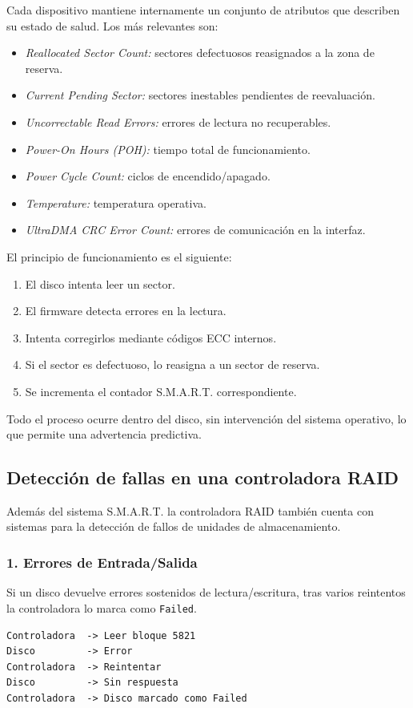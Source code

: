 Cada dispositivo mantiene internamente un conjunto de atributos que describen su estado de salud. Los más relevantes son:
\begin{itemize}
  \item \textit{Reallocated Sector Count:} sectores defectuosos reasignados a la zona de reserva.
  \item \textit{Current Pending Sector:} sectores inestables pendientes de reevaluación.
  \item \textit{Uncorrectable Read Errors:} errores de lectura no recuperables.
  \item \textit{Power-On Hours (POH):} tiempo total de funcionamiento.
  \item \textit{Power Cycle Count:} ciclos de encendido/apagado.
  \item \textit{Temperature:} temperatura operativa.
  \item \textit{UltraDMA CRC Error Count:} errores de comunicación en la interfaz.
\end{itemize}
El principio de funcionamiento es el siguiente:
\begin{enumerate}
  \item El disco intenta leer un sector.
  \item El firmware detecta errores en la lectura.
  \item Intenta corregirlos mediante códigos ECC internos.
  \item Si el sector es defectuoso, lo reasigna a un sector de reserva.
  \item Se incrementa el contador S.M.A.R.T. correspondiente.
\end{enumerate}
Todo el proceso ocurre dentro del disco, sin intervención del sistema operativo, lo que permite una advertencia predictiva.

\subsection{Detección de fallas en una controladora RAID}

Además del sistema S.M.A.R.T. la controladora RAID también cuenta con sistemas para la detección de fallos de unidades de almacenamiento.

\subsubsection{1. Errores de Entrada/Salida}
Si un disco devuelve errores sostenidos de lectura/escritura, tras varios reintentos la controladora lo marca como \texttt{Failed}.
\begin{verbatim}
Controladora  -> Leer bloque 5821
Disco         -> Error
Controladora  -> Reintentar
Disco         -> Sin respuesta
Controladora  -> Disco marcado como Failed
\end{verbatim}

